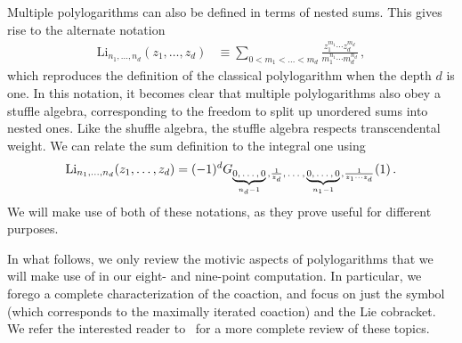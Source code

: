 \documentclass[11pt]{article}
\newcommand{\fwboxL}[2]{\text{\makebox[#1][l]{$#2$}}}
\begin{document}
Multiple polylogarithms can also be defined in terms of nested sums. This gives rise to the alternate notation
\begin{align} \label{eq:Li_notation}
\text{Li}_{n_1,\dots,n_d}(z_1,\dots, z_d) &\equiv \sum_{0 < m_1 < \dots < m_d} \frac{z_1^{m_1} \cdots z_d^{m_d}}{m_1^{n_1} \cdots m_d^{n_d}} \, ,
\end{align}
which reproduces the definition of the classical polylogarithm when the depth $d$ is one. In this notation, it becomes clear that multiple polylogarithms also obey a stuffle algebra, corresponding to the freedom to split up unordered sums into nested ones. Like the shuffle algebra, the stuffle algebra respects transcendental weight. We can relate the sum definition to the integral one using
\begin{align}
\text{Li}_{n_1,\dots,n_d}(z_1,\dots, z_d) = (-1)^d G_{\fwboxL{28pt}{\underbrace{0,\dots,0}_{n_d-1}},\frac{1}{z_d},\fwboxL{13pt}{\,\dots},\fwboxL{29pt}{\,\underbrace{0,\dots,0}_{n_1-1}},\frac{1}{z_1 \cdots z_d}}(1) \, .
\end{align}
We will make use of both of these notations, as they prove useful for different purposes. 

In what follows, we only review the motivic aspects of polylogarithms that we will make use of in our eight- and nine-point computation. In particular, we forego a complete characterization of the coaction, and focus on just the symbol (which corresponds to the maximally iterated coaction) and the Lie cobracket. We refer the interested reader to~\cite{Duhr:2014woa} for a more complete review of these topics.





\end{document}
